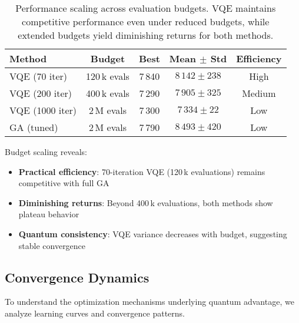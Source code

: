 
\begin{table}[htb]
    \centering
    \caption{Performance scaling across evaluation budgets. VQE maintains competitive performance even under reduced budgets, while extended budgets yield diminishing returns for both methods.}
    \label{tab:budget_scaling}
    \begin{tabular}{lcccc}
        \toprule
        Method & Budget & Best & Mean $\pm$ Std & Efficiency \\
        \midrule
        VQE (70 iter) & 120\,k evals & 7\,840 & $8\,142 \pm 238$ & High \\
        VQE (200 iter) & 400\,k evals & 7\,290 & $7\,905 \pm 325$ & Medium \\
        VQE (1000 iter) & 2\,M evals & 7\,300 & $7\,334 \pm 22$ & Low \\
        GA (tuned) & 2\,M evals & 7\,790 & $8\,493 \pm 420$ & Low \\
        \bottomrule
    \end{tabular}
\end{table}

Budget scaling reveals:
\begin{itemize}[nosep]
    \item \textbf{Practical efficiency}: 70-iteration VQE (120\,k evaluations) remains competitive with full GA
    \item \textbf{Diminishing returns}: Beyond 400\,k evaluations, both methods show plateau behavior
    \item \textbf{Quantum consistency}: VQE variance decreases with budget, suggesting stable convergence
\end{itemize}

\subsection{Convergence Dynamics}

To understand the optimization mechanisms underlying quantum advantage, we analyze learning curves and convergence patterns.


